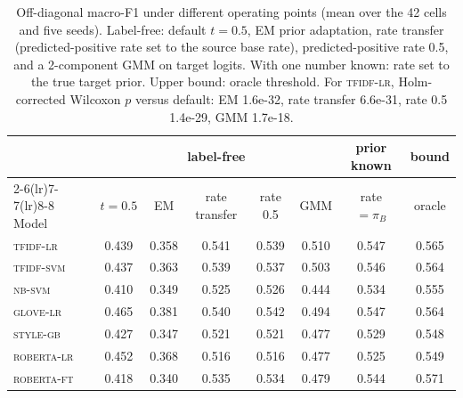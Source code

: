 \begin{table}[t]
\centering
\caption{Off-diagonal macro-F1 under different operating points (mean over the 42 cells and five seeds). Label-free: default $t=0.5$, EM prior adaptation, rate transfer (predicted-positive rate set to the source base rate), predicted-positive rate 0.5, and a 2-component GMM on target logits. With one number known: rate set to the true target prior. Upper bound: oracle threshold. For \textsc{tfidf-lr}, Holm-corrected Wilcoxon $p$ versus default: EM 1.6e-32, rate transfer 6.6e-31, rate 0.5 1.4e-29, GMM 1.7e-18.}\label{tab:oppoints}
\small
\begin{tabular}{@{}lccccccc@{}}
\toprule
 & \multicolumn{5}{c}{label-free} & prior known & bound \\
\cmidrule(lr){2-6}\cmidrule(lr){7-7}\cmidrule(lr){8-8}
Model & $t=0.5$ & EM & rate transfer & rate 0.5 & GMM & rate $=\pi_B$ & oracle \\
\midrule
\textsc{tfidf-lr} & 0.439 & 0.358 & 0.541 & 0.539 & 0.510 & 0.547 & 0.565 \\
\textsc{tfidf-svm} & 0.437 & 0.363 & 0.539 & 0.537 & 0.503 & 0.546 & 0.564 \\
\textsc{nb-svm} & 0.410 & 0.349 & 0.525 & 0.526 & 0.444 & 0.534 & 0.555 \\
\textsc{glove-lr} & 0.465 & 0.381 & 0.540 & 0.542 & 0.494 & 0.547 & 0.564 \\
\textsc{style-gb} & 0.427 & 0.347 & 0.521 & 0.521 & 0.477 & 0.529 & 0.548 \\
\textsc{roberta-lr} & 0.452 & 0.368 & 0.516 & 0.516 & 0.477 & 0.525 & 0.549 \\
\textsc{roberta-ft} & 0.418 & 0.340 & 0.535 & 0.534 & 0.479 & 0.544 & 0.571 \\
\bottomrule
\end{tabular}
\end{table}
